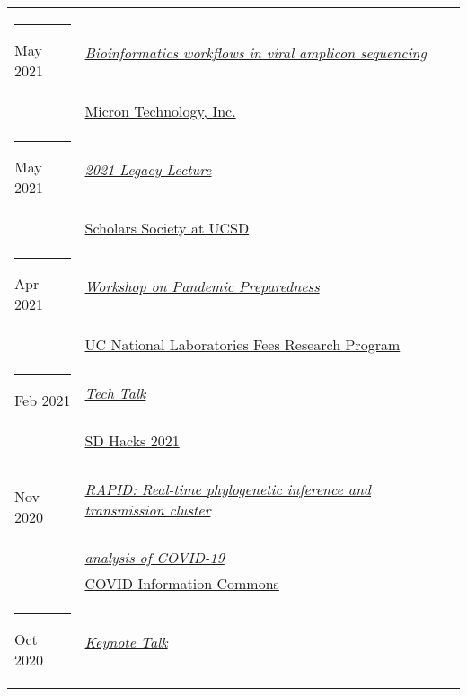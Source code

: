 \documentclass[margin,line]{res}
\begin{document}
\begin{resume}
\begin{longtable}{@{}p{0.7in}p{4in}}
\hspace*{-4mm} \rule{-1mm}{5mm} May 2021 & \href{https://www.micron.com/}{\textit{Bioinformatics workflows in viral amplicon sequencing}}\\*
\hspace*{-4mm} & \hspace{4mm} \href{https://www.micron.com/}{Micron Technology, Inc.}\\
\hspace*{-4mm} \rule{-1mm}{5mm} May 2021 & \href{https://studentorg.ucsd.edu/Home/Details/12340}{\textit{2021 Legacy Lecture}}\\*
\hspace*{-4mm} & \hspace{4mm} \href{https://studentorg.ucsd.edu/Home/Details/12340}{Scholars Society at UCSD}\\
\hspace*{-4mm} \rule{-1mm}{5mm} Apr 2021 & \href{https://www.ucop.edu/research-initiatives/programs/lab-fees/workshops.html}{\textit{Workshop on Pandemic Preparedness}}\\*
\hspace*{-4mm} & \hspace{4mm} \href{https://www.ucop.edu/research-initiatives/programs/lab-fees/index.html}{UC National Laboratories Fees Research Program}\\
\hspace*{-4mm} \rule{-1mm}{5mm} Feb 2021 & \href{https://www.sdhacks.io/}{\textit{Tech Talk}}\\*
\hspace*{-4mm} & \hspace{4mm} \href{https://www.sdhacks.io/}{SD Hacks 2021}\\
\hspace*{-4mm} \rule{-1mm}{5mm} Nov 2020 & \href{https://www.youtube.com/watch?v=6-fDbTY8ySI}{\textit{RAPID: Real-time phylogenetic inference and transmission cluster}}\\*
\hspace*{-4mm} & \hspace{4mm} \href{https://www.youtube.com/watch?v=6-fDbTY8ySI}{\textit{analysis of COVID-19}}\\*
\hspace*{-4mm} & \hspace{4mm} \href{https://covidinfocommons.datascience.columbia.edu/}{COVID Information Commons}\\
\hspace*{-4mm} \rule{-1mm}{5mm} Oct 2020 & \href{http://distance.ncu.edu.jm/proposal_submission}{\textit{Keynote Talk}}\\*

\end{longtable}
\end{resume}
\end{document}
